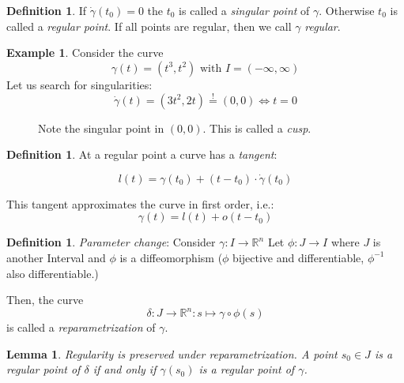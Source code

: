 \documentclass[a4paper,11pt,notitlepage,fullpage]{paper}
\theoremstyle{plain}
\newtheorem{lem}[thm]{Lemma}
\theoremstyle{definition}
\newtheorem{defn}[thm]{Definition} %
\newtheorem{exmp}[thm]{Example} %
\begin{document}
\begin{defn}
If $\dot\gamma(t_0) = 0$ the $t_0$ is called a \emph{singular point} of $\gamma$. Otherwise $t_0$ is called a \emph{regular point}. If all points are regular, then we call $\gamma$ \emph{regular}.
\end{defn}

\begin{exmp}
Consider the curve
\begin{equation*}
\gamma(t) = (t^3, t^2) \text{ with } I = (-\infty, \infty)
\end{equation*}
Let us search for singularities:
\begin{equation*}
\dot\gamma(t) = (3t^2, 2t) \stackrel{!}{=} (0,0) \Leftrightarrow t = 0
\end{equation*}

\begin{figure}[H]
\centering
\def\svgwidth{0.7\textwidth}

\caption{Note the singular point in $(0,0)$. This is called a \emph{cusp}.}
\label{fig:cusp}
\end{figure}
\end{exmp}


\begin{defn}
At a regular point a curve has a \emph{tangent}:

\begin{equation*}
l(t) = \gamma(t_0) + (t-t_0) \cdot \dot\gamma(t_0)
\end{equation*}

This tangent approximates the curve in first order, i.e.:
\begin{equation*}
\gamma(t) = l(t) + o(t-t_0)
\end{equation*}

\end{defn}


\begin{defn}
\emph{Parameter change}: Consider $\gamma: I \to \mathbb R^n$ Let $\phi: J \to I$ where $J$ is another Interval and $\phi$ is a diffeomorphism ($\phi$ bijective and differentiable, $\phi^{-1}$ also differentiable.)

Then, the curve
\begin{equation*}
\delta : J \to \mathbb R^n : s \mapsto \gamma \circ \phi(s)
\end{equation*}
is called a \emph{reparametrization} of $\gamma$.
\end{defn}

\begin{lem}
Regularity is preserved under reparametrization. A point $s_0 \in J$ is a regular point of $\delta$ if and only if $\gamma(s_0)$ is a regular point of $\gamma$.
\end{lem}
\end{document}
